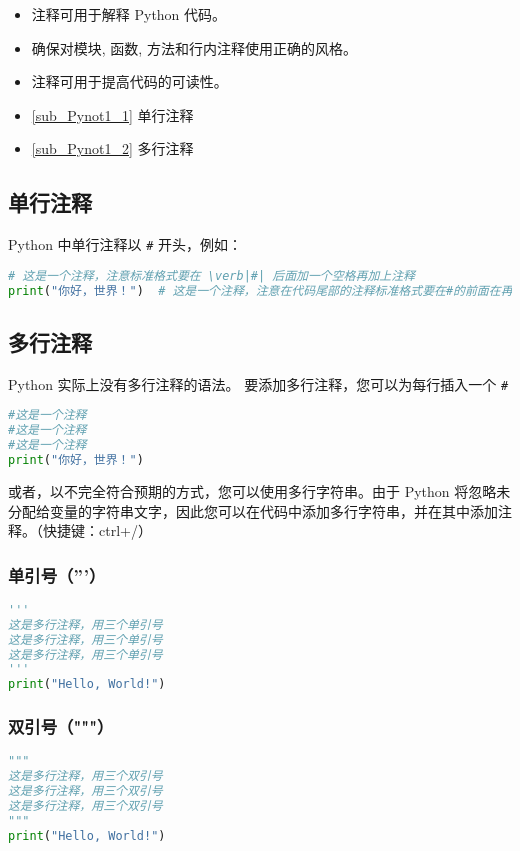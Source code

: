
\begin{itemize}
\item 注释可用于解释 Python 代码。
\item 确保对模块, 函数, 方法和行内注释使用正确的风格。
\item 注释可用于提高代码的可读性。
\end{itemize}

\begin{itemize}
\item \autoref{sub_Pynot1_1} 单行注释
\item \autoref{sub_Pynot1_2} 多行注释
\end{itemize}

\subsection{单行注释}\label{sub_Pynot1_1}
Python 中单行注释以 \verb|#| 开头，例如：
\begin{lstlisting}[language=python]
# 这是一个注释，注意标准格式要在 \verb|#| 后面加一个空格再加上注释
print("你好，世界！")  # 这是一个注释，注意在代码尾部的注释标准格式要在#的前面在再加两个空格
\end{lstlisting}

\subsection{多行注释}\label{sub_Pynot1_2}
Python 实际上没有多行注释的语法。
要添加多行注释，您可以为每行插入一个 \verb|#|
\begin{lstlisting}[language=python]
#这是一个注释
#这是一个注释
#这是一个注释
print("你好，世界！")
\end{lstlisting}

或者，以不完全符合预期的方式，您可以使用多行字符串。由于 Python 将忽略未分配给变量的字符串文字，因此您可以在代码中添加多行字符串，并在其中添加注释。（快捷键：ctrl+/）
\subsubsection{单引号（'''）}
\begin{lstlisting}[language=python]
'''
这是多行注释，用三个单引号
这是多行注释，用三个单引号 
这是多行注释，用三个单引号
'''
print("Hello, World!")
\end{lstlisting}

\subsubsection{双引号（"""）}
\begin{lstlisting}[language=python]
"""
这是多行注释，用三个双引号
这是多行注释，用三个双引号 
这是多行注释，用三个双引号
"""
print("Hello, World!")
\end{lstlisting}
